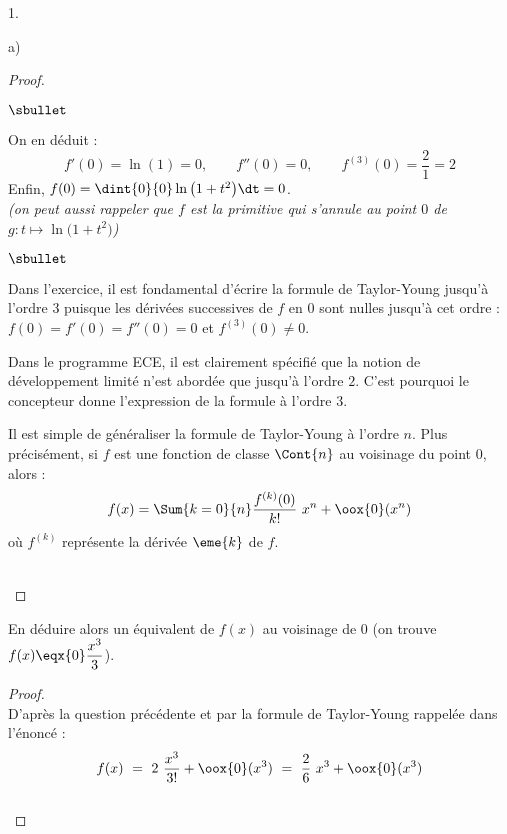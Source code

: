 \documentclass[11pt]{article}%
\begin{document}
\begin{noliste}{1.}
\begin{noliste}{a)}
\begin{proof}
\begin{noliste}{$\sbullet$}
      \item On en déduit : 
        \[
        f'(0) = \ln(1) = 0, \qquad f''(0) = 0, \qquad f^{(3)}(0) =
        \dfrac{2}{1} = 2
        \]
        Enfin, $f(0) = \dint{0}{0} \ln\big( 1+t^2 \big) \dt = 0$.\\%
        {\it (on peut aussi rappeler que $f$ est la primitive qui
          s'annule au point $0$ de $g : t \mapsto \ln\big( 1+t^2
          \big)$)}
      \end{noliste}
      \begin{remark}%
        \begin{noliste}{$\sbullet$}
        \item Dans l'exercice, il est fondamental d'écrire la formule
          de Taylor-Young jusqu'à l'ordre $3$ puisque les dérivées
          successives de $f$ en $0$ sont nulles jusqu'à cet ordre :
          $f(0) = f'(0) = f''(0) = 0$ et $f^{(3)}(0) \neq 0$.
        \item Dans le programme ECE, il est clairement spécifié que la
          notion de développement limité n'est abordée que jusqu'à
          l'ordre $2$. C'est pourquoi le concepteur donne l'expression
          de la formule à l'ordre $3$.

        \item Il est simple de généraliser la formule de Taylor-Young
          à l'ordre $n$. Plus précisément, si $f$ est une fonction de
          classe $\Cont{n}$ au voisinage du point $0$, alors :
          \[
          f(x) = \Sum{k=0}{n} \dfrac{f^{(k)}(0)}{k!} \ x^n +
          \oox{0}(x^{n})
          \]
          où $f^{(k)}$ représente la dérivée $\eme{k}$ de $f$.
        \end{noliste}
      \end{remark}~\\[-1.4cm]
    \end{proof}

  \item En déduire alors un équivalent de $f(x)$ au voisinage de $0$
    (on trouve $f(x) \eqx{0} \dfrac{x^3}{3}$).

    \begin{proof}~\\%
      D'après la question précédente et par la formule de Taylor-Young
      rappelée dans l'énoncé :
      \[
      f(x) \ = \ 2 \ \dfrac{x^3}{3!} + \oox{0}(x^3)
      \ = \ \dfrac{2}{6} \ x^3 + \oox{0}(x^3)
      \]
      ~\\[-1cm]
    \end{proof}
  \end{noliste}


\end{noliste}
\end{document}

